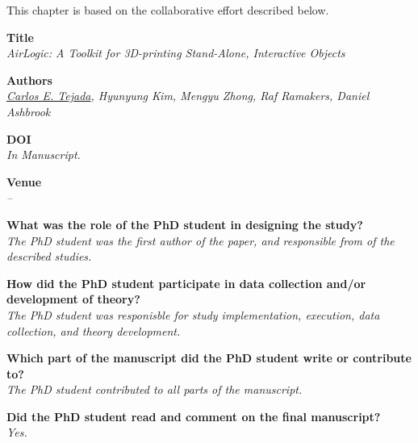   \newpage

  This chapter is based on the collaborative effort described below.

  \vfill

  \noindent
  \textbf{Title}\\
  \textit{AirLogic: A Toolkit for 3D-printing Stand-Alone, Interactive Objects}

  \bigskip

  \noindent
  \textbf{Authors}\\
  \textit{\underline{Carlos E. Tejada}, Hyunyung Kim, Mengyu Zhong, Raf Ramakers, Daniel Ashbrook}

  \bigskip

  \noindent
  \textbf{DOI}\\
  \textit{In Manuscript.}

  \bigskip

  \noindent
  \textbf{Venue}\\
  \textit{--}

  \bigskip

  \noindent
  \textbf{What was the role of the PhD student in designing the study?}\\
  \textit{The PhD student was the first author of the paper, and responsible
    from of the described studies.}

  \bigskip

  \noindent
  \textbf{How did the PhD student participate in data collection and/or development of theory?}\\
  \textit{The PhD student was responisble for study implementation, execution,
    data collection, and theory development.}

  \bigskip

  \noindent
  \textbf{Which part of the manuscript did the PhD student write or contribute to?}\\
  \textit{The PhD student contributed to all parts of the manuscript.}

  \bigskip

  \noindent
  \textbf{Did the PhD student read and comment on the final manuscript?}\\
  \textit{Yes.}

  \bigskip
  \vfill

  \newpage

